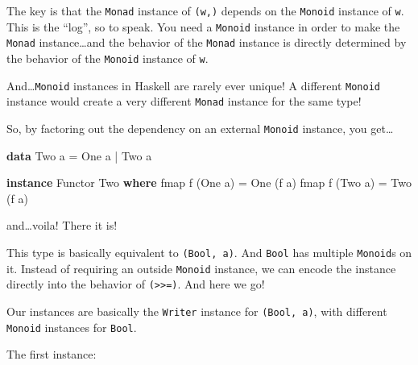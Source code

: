 \documentclass[]{article}
\newenvironment{Shaded}{}{}
\newcommand{\DataTypeTok}[1]{\textcolor[rgb]{0.56,0.13,0.00}{#1}}
\newcommand{\FunctionTok}[1]{\textcolor[rgb]{0.02,0.16,0.49}{#1}}
\newcommand{\KeywordTok}[1]{\textcolor[rgb]{0.00,0.44,0.13}{\textbf{#1}}}
\newcommand{\NormalTok}[1]{#1}
\newcommand{\OperatorTok}[1]{\textcolor[rgb]{0.40,0.40,0.40}{#1}}
\newcommand{\OtherTok}[1]{\textcolor[rgb]{0.00,0.44,0.13}{#1}}
\begin{document}
The key is that the \texttt{Monad} instance of \texttt{(w,)} depends on the
\texttt{Monoid} instance of \texttt{w}. This is the ``log'', so to speak. You
need a \texttt{Monoid} instance in order to make the \texttt{Monad}
instance\ldots and the behavior of the \texttt{Monad} instance is directly
determined by the behavior of the \texttt{Monoid} instance of \texttt{w}.

And\ldots{}\texttt{Monoid} instances in Haskell are rarely ever unique! A
different \texttt{Monoid} instance would create a very different \texttt{Monad}
instance for the same type!

So, by factoring out the dependency on an external \texttt{Monoid} instance, you
get\ldots{}

\begin{Shaded}
\begin{Highlighting}[]
\KeywordTok{data} \DataTypeTok{Two}\NormalTok{ a }\OtherTok{=} \DataTypeTok{One}\NormalTok{ a }\OperatorTok{|} \DataTypeTok{Two}\NormalTok{ a}

\KeywordTok{instance} \DataTypeTok{Functor} \DataTypeTok{Two} \KeywordTok{where}
    \FunctionTok{fmap}\NormalTok{ f (}\DataTypeTok{One}\NormalTok{ a) }\OtherTok{=} \DataTypeTok{One}\NormalTok{ (f a)}
    \FunctionTok{fmap}\NormalTok{ f (}\DataTypeTok{Two}\NormalTok{ a) }\OtherTok{=} \DataTypeTok{Two}\NormalTok{ (f a)}
\end{Highlighting}
\end{Shaded}

and\ldots voila! There it is!

This type is basically equivalent to \texttt{(Bool,\ a)}. And \texttt{Bool} has
multiple \texttt{Monoid}s on it. Instead of requiring an outside \texttt{Monoid}
instance, we can encode the instance directly into the behavior of
\texttt{(\textgreater{}\textgreater{}=)}. And here we go!

Our instances are basically the \texttt{Writer} instance for
\texttt{(Bool,\ a)}, with different \texttt{Monoid} instances for \texttt{Bool}.

The first instance:
\end{document}
